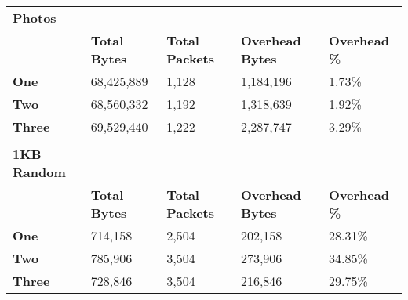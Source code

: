 \begin{table}[h!]
\begin{tabular}{l l l l l}
		\textbf{Photos}     &                      &                        &                         &                      \\
		\textbf{}           & \textbf{Total Bytes} & \textbf{Total Packets} & \textbf{Overhead Bytes} & \textbf{Overhead \%} \\
		\hline
		\textbf{One}        & 68,425,889           & 1,128                  & 1,184,196               & 1.73\%               \\
		\hline
		\textbf{Two}        & 68,560,332           & 1,192                  & 1,318,639               & 1.92\%               \\
		\hline
		\textbf{Three}      & 69,529,440           & 1,222                  & 2,287,747               & 3.29\%               \\
		\hline
		                    &                      &                        &                         &                      \\
		\textbf{1KB Random} &                      &                        &                         &                      \\
		\textbf{}           & \textbf{Total Bytes} & \textbf{Total Packets} & \textbf{Overhead Bytes} & \textbf{Overhead \%} \\
		\hline
		\textbf{One}        & 714,158              & 2,504                  & 202,158                 & 28.31\%              \\
		\hline
		\textbf{Two}        & 785,906              & 3,504                  & 273,906                 & 34.85\%              \\
		\hline
		\textbf{Three}      & 728,846              & 3,504                  & 216,846                 & 29.75\%              \\
		\hline
	\end{tabular}
\end{table}

